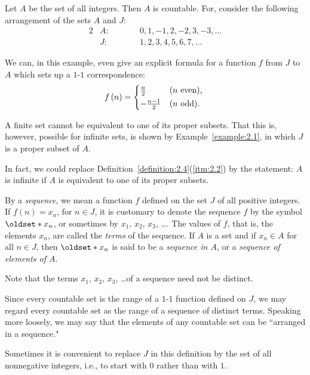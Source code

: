 \begin{example}\label{example:2.1}
    Let \(A\) be the set of all integers. Then \(A\) is countable. For, consider the following arrangement of the sets \(A\) and \(J\):
    \begin{alignat*}{2}
        &A\colon\qquad&&0,1,-1,2,-2,3,-3,\ldots\\
        &J\colon\qquad&&1,2,3,4,5,6,7,\ldots
    \end{alignat*}
\end{example}

We can, in this example, even give an explicit formula for a function \(f\) from \(J\) to \(A\) which sets up a \(1\)-\(1\) correspondence:
\begin{equation*}
    f\left(n\right)=
    \begin{cases*}
        \frac{n}{2} & (\(n\) even), \\
        -\frac{n-1}{2} & (\(n\) odd). \\
    \end{cases*}
\end{equation*}

\begin{remark}
    A finite set cannot be equivalent to one of its proper subsets. That this is, however, possible for infinite sets, is shown by Example~\ref{example:2.1}, in which \(J\) is a proper subset of \(A\).
    
    In fact, we could replace Definition~\ref{definition:2.4}(\ref{itm:2.2}) by the statement: \(A\) is infinite if \(A\) is equivalent to one of its proper subsets.
\end{remark}

\begin{definition}
    By a \emph{sequence}, we mean a function \(f\) defined on the set \(J\) of all positive integers. If \(f\left(n\right)=x_n\), for \(n\in J\), it is customary to denote the sequence \(f\) by the symbol \(\set{x_n}\), or sometimes by \(x_1\), \(x_2\), \(x_3\), \ldots. The values of \(f\), that is, the elements \(x_n\), are called the \emph{terms} of the sequence. If \(A\) is a set and if \(x_n\in A\) for all \(n\in J\), then \(\set{x_n}\) is said to be a \emph{sequence in \(A\)}, or a \emph{sequence of elements of \(A\)}.
    
    Note that the terms \(x_1\), \(x_2\), \(x_3\), \ldots of a sequence need not be distinct.
    
    Since every countable set is the range of a \(1\)-\(1\) function defined on \(J\), we may regard every countable set as the range of a sequence of distinct terms. Speaking more loosely, we may say that the elements of any countable set can be ``arranged in a sequence."
    
    Sometimes it is convenient to replace \(J\) in this definition by the set of all nonnegative integers, i.e., to start with \(0\) rather than with \(1\).
\end{definition}

